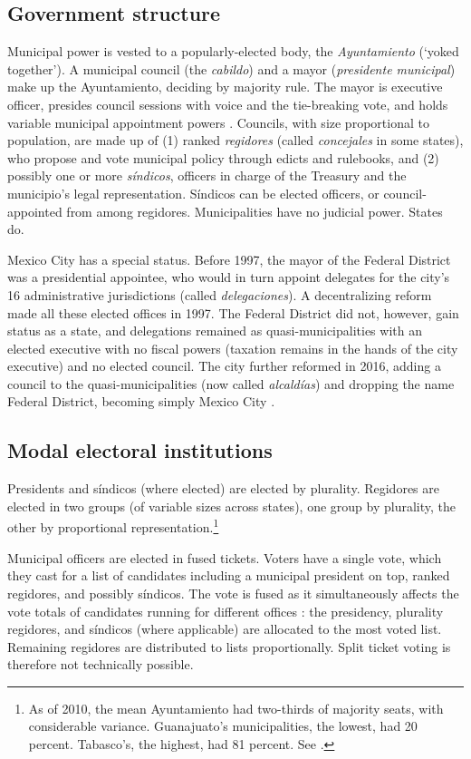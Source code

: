 \documentclass[letter,12pt]{article}
\begin{document}
\subsection{Government structure}
Municipal power is vested to a popularly-elected body, the \emph{Ayuntamiento} (`yoked together'). A municipal council (the \emph{cabildo}) and a mayor (\emph{presidente municipal}) make up the Ayuntamiento, deciding by majority rule. The mayor is executive officer, presides council sessions with voice and the tie-breaking vote, and holds variable municipal appointment powers \citep{robles-mtz.Municipio.2009, rmz-millan.2000}. Councils, with size proportional to population, are made up of (1) ranked \emph{regidores} (called \emph{concejales} in some states), who propose and vote municipal policy through edicts and rulebooks, and (2) possibly one or more \emph{síndicos}, officers in charge of the Treasury and the municipio's legal representation. Síndicos can be elected officers, or council-appointed from among regidores. Municipalities have no judicial power. States do.

Mexico City has a special status. Before 1997, the mayor of the Federal District was a presidential appointee, who would in turn appoint delegates for the city's 16 administrative jurisdictions (called \emph{delegaciones}). A decentralizing reform made all these elected offices in 1997. The Federal District did not, however, gain status as a state, and delegations remained as quasi-municipalities with an elected executive with no fiscal powers (taxation remains in the hands of the city executive) and no elected council. The city further reformed in 2016, adding a council to the quasi-municipalities (now called \emph{alcaldías}) and dropping the name Federal District, becoming simply Mexico City \citep{rabell.2017}.

\subsection{Modal electoral institutions}
Presidents and síndicos (where elected) are elected by plurality. Regidores are elected in two groups (of variable sizes across states), one group by plurality, the other by proportional representation.\footnote{As of 2010, the mean Ayuntamiento had two-thirds of majority seats, with considerable variance. Guanajuato's municipalities, the lowest, had 20 percent. Tabasco's, the highest, had 81 percent. See \citet[][:14]{gil.2010}.} 

Municipal officers are elected in fused tickets. Voters have a single vote, which they cast for a list of candidates including a municipal president on top, ranked regidores, and possibly síndicos. The vote is fused as it simultaneously affects the vote totals of candidates running for different offices \citep[see ][:42]{cox.1997}: the presidency, plurality regidores, and síndicos (where applicable) are allocated to the most voted list. Remaining regidores are distributed to lists proportionally. Split ticket voting is therefore not technically possible.
\end{document}
